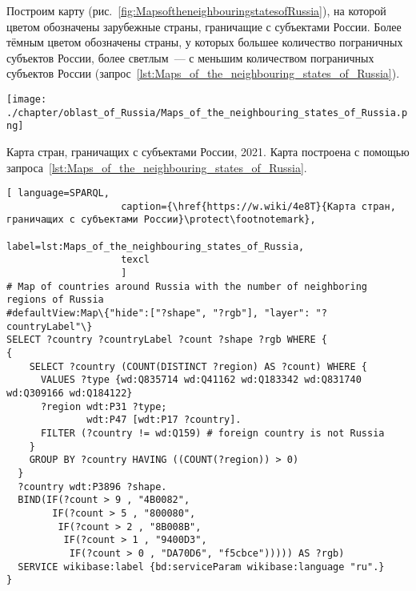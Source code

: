 Построим карту (рис.~\ref{fig:MapsoftheneighbouringstatesofRussia}), 
на которой цветом обозначены зарубежные страны, 
граничащие с субъектами России. 
Более тёмным цветом обозначены страны, у которых большее количество пограничных субъектов России, 
более светлым~--- с меньшим количеством пограничных субъектов России 
(запрос~\ref{lst:Maps_of_the_neighbouring_states_of_Russia}).
%
\begin{marginfigure}[0\baselineskip]
	\texttt{[image: ./chapter/oblast\_of\_Russia/Maps\_of\_the\_neighbouring\_states\_of\_Russia.png]}
	\caption[Карта стран, граничащих с Россией, 2021 год.]{Карта стран, граничащих с субъектами России, 2021. Карта построена с помощью запроса~\protect\ref{lst:Maps_of_the_neighbouring_states_of_Russia}.}%
      \label{fig:MapsoftheneighbouringstatesofRussia}%
\end{marginfigure} 

\lstset{numbers=left, firstnumber=1, frame=single}
\begin{lstlisting}[ language=SPARQL, 
                    caption={\href{https://w.wiki/4e8T}{Карта стран, граничащих с субъектами России}\protect\footnotemark},
                    label=lst:Maps_of_the_neighbouring_states_of_Russia,
                    texcl 
                    ]
# Map of countries around Russia with the number of neighboring regions of Russia
#defaultView:Map\{"hide":["?shape", "?rgb"], "layer": "?countryLabel"\}
SELECT ?country ?countryLabel ?count ?shape ?rgb WHERE {
{
    SELECT ?country (COUNT(DISTINCT ?region) AS ?count) WHERE {
      VALUES ?type {wd:Q835714 wd:Q41162 wd:Q183342 wd:Q831740 wd:Q309166 wd:Q184122}
      ?region wdt:P31 ?type;
              wdt:P47 [wdt:P17 ?country].
      FILTER (?country != wd:Q159) # foreign country is not Russia
    }
    GROUP BY ?country HAVING ((COUNT(?region)) > 0)
  }
  ?country wdt:P3896 ?shape.
  BIND(IF(?count > 9 , "4B0082", 
        IF(?count > 5 , "800080", 
         IF(?count > 2 , "8B008B", 
          IF(?count > 1 , "9400D3", 
           IF(?count > 0 , "DA70D6", "f5cbce"))))) AS ?rgb)
  SERVICE wikibase:label {bd:serviceParam wikibase:language "ru".}
}
\end{lstlisting}%




